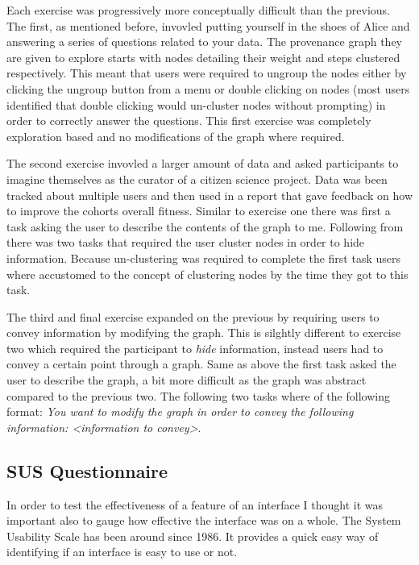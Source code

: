Each exercise was progressively more conceptually difficult than the previous. The first, as mentioned before, invovled putting yourself in the shoes of Alice and answering a series of questions related to your data. The provenance graph they are given to explore starts with nodes detailing their weight and steps clustered respectively. This meant that users were required to ungroup the nodes either by clicking the ungroup button from a menu or double clicking on nodes (most users identified that double clicking would un-cluster nodes without prompting) in order to correctly answer the questions. This first exercise was completely exploration based and no modifications of the graph where required.

The second exercise invovled a larger amount of data and asked participants to imagine themselves as the curator of a citizen science project. Data was been tracked about multiple users and then used in a report that gave feedback on how to improve the cohorts overall fitness. Similar to exercise one there was first a task asking the user to describe the contents of the graph to me. Following from there was two tasks that required the user cluster nodes in order to hide information. Because un-clustering was required to complete the first task users where accustomed to the concept of clustering nodes by the time they got to this task.


The third and final exercise expanded on the previous by requiring users to convey information by modifying the graph. This is silghtly different to exercise two which required the participant to \textit{hide} information, instead users had to convey a certain point through a graph. Same as above the first task asked the user to describe the graph, a bit more difficult as the graph was abstract compared to the previous two. The following two tasks where of the following format: \textit{You want to modify the graph in order to convey the following information: <information to convey>}. 

\subsection{SUS Questionnaire}
\label{sec:sus_questionnaire}


In order to test the effectiveness of a feature of an interface I thought it was important also to gauge how effective the interface was on a whole. The System Usability Scale has been around since 1986. It provides a quick easy way of identifying if an interface is easy to use or not. 

